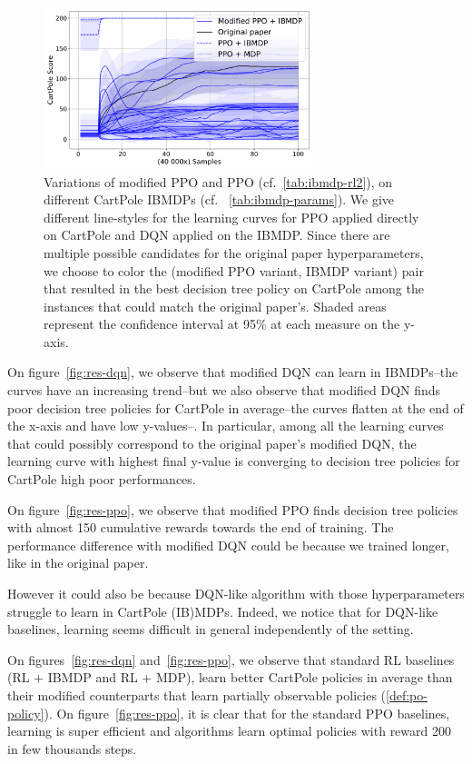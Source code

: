 \begin{figure}
    \centering
    \includegraphics[width=0.7\textwidth]{images/images_part1/ppo.pdf}
    \caption{Variations of modified PPO and PPO (cf.~\ref{tab:ibmdp-rl2}), on different CartPole IBMDPs (cf. ~\ref{tab:ibmdp-params}). We give different line-styles for the learning curves for PPO applied directly on CartPole and DQN applied on the IBMDP.
    Since there are multiple possible candidates for the original paper hyperparameters, we choose to color the (modified PPO variant, IBMDP variant) pair that resulted in the best decision tree policy on CartPole among the instances that could match the original paper's.
    Shaded areas represent the confidence interval at 95\% at each measure on the y-axis.}
\end{figure}\label{fig:res-ppo}

On figure~\ref{fig:res-dqn}, we observe that modified DQN can learn in IBMDPs--the curves have an increasing trend--but we also observe that modified DQN finds poor decision tree policies for CartPole in average--the curves flatten at the end of the x-axis and have low y-values--.
In particular, among all the learning curves that could possibly correspond to the original paper's modified DQN, the learning curve with highest final y-value is converging to decision tree policies for CartPole high poor performances.

On figure~\ref{fig:res-ppo}, we observe that modified PPO finds decision tree policies with almost 150 cumulative rewards towards the end of training. The performance difference with modified DQN could be because we trained longer, like in the original paper.

However it could also be because DQN-like algorithm with those hyperparameters struggle to learn in CartPole (IB)MDPs.
Indeed, we notice that for DQN-like baselines, learning seems difficult in general independently of the setting.

On figures~\ref{fig:res-dqn} and~\ref{fig:res-ppo}, we observe that standard RL baselines (RL + IBMDP and RL + MDP), learn better CartPole policies in average than their modified counterparts that learn partially observable policies (\ref{def:po-policy}). 
On figure~\ref{fig:res-ppo}, it is clear that for the standard PPO baselines, learning is super efficient and algorithms learn optimal policies with reward 200 in few thousands steps.

